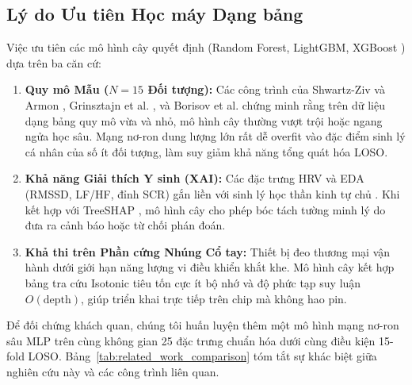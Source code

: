\documentclass[conference]{IEEEtran}
\begin{document}
\subsection{Lý do Ưu tiên Học máy Dạng bảng}
Việc ưu tiên các mô hình cây quyết định (Random Forest, LightGBM, XGBoost \cite{chen2016xgboost}) dựa trên ba căn cứ:
\begin{enumerate}
    \item \textbf{Quy mô Mẫu ($N=15$ Đối tượng):} Các công trình của Shwartz-Ziv và Armon \cite{shwartzziv2022tabular}, Grinsztajn et al. \cite{grinsztajn2022why}, và Borisov et al. \cite{borisov2024deep} chứng minh rằng trên dữ liệu dạng bảng quy mô vừa và nhỏ, mô hình cây thường vượt trội hoặc ngang ngửa học sâu. Mạng nơ-ron dung lượng lớn rất dễ overfit vào đặc điểm sinh lý cá nhân của số ít đối tượng, làm suy giảm khả năng tổng quát hóa LOSO.
    \item \textbf{Khả năng Giải thích Y sinh (XAI):} Các đặc trưng HRV và EDA (RMSSD, LF/HF, đỉnh SCR) gắn liền với sinh lý học thần kinh tự chủ \cite{taskforce1996heart, greco2016cvxeda, tarvainen2014kubios}. Khi kết hợp với TreeSHAP \cite{lundberg2020local}, mô hình cây cho phép bóc tách tường minh lý do đưa ra cảnh báo hoặc từ chối phán đoán.
    \item \textbf{Khả thi trên Phần cứng Nhúng Cổ tay:} Thiết bị đeo thương mại vận hành dưới giới hạn năng lượng vi điều khiển khắt khe. Mô hình cây kết hợp bảng tra cứu Isotonic tiêu tốn cực ít bộ nhớ và độ phức tạp suy luận $O(\text{depth})$, giúp triển khai trực tiếp trên chip mà không hao pin.
\end{enumerate}

Để đối chứng khách quan, chúng tôi huấn luyện thêm một mô hình mạng nơ-ron sâu MLP trên cùng không gian 25 đặc trưng chuẩn hóa dưới cùng điều kiện 15-fold LOSO. Bảng~\ref{tab:related_work_comparison} tóm tắt sự khác biệt giữa nghiên cứu này và các công trình liên quan.
\end{document}
